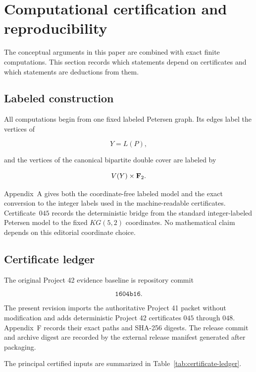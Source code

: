 \section{Computational certification and reproducibility}

The conceptual arguments in this paper are combined with exact finite
computations. This section records which statements depend on
certificates and which statements are deductions from them.

\subsection{Labeled construction}

All computations begin from one fixed labeled Petersen graph. Its edges
label the vertices of

\[
Y=L(P),
\]

and the vertices of the canonical bipartite double cover are labeled by

\[
V(Y)\times\mathbf F_2.
\]

Appendix~A gives both the coordinate-free labeled model and the exact
conversion to the integer labels used in the machine-readable
certificates. Certificate~\(045\) records the deterministic bridge from
the standard integer-labeled Petersen model to the fixed \(KG(5,2)\)
coordinates. No mathematical claim depends on this editorial coordinate
choice.

\subsection{Certificate ledger}

The original Project 42 evidence baseline is repository commit

\[
\texttt{1604b16}.
\]

The present revision imports the authoritative Project 41 packet without
modification and adds deterministic Project 42 certificates \(045\)
through \(048\). Appendix~F records their exact paths and SHA-256
digests. The release commit and archive digest are recorded by the
external release manifest generated after packaging.

The principal certified inputs are summarized in
Table~\ref{tab:certificate-ledger}.

